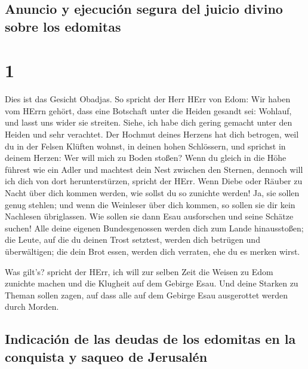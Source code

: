 \hypertarget{anuncio-y-ejecuciuxf3n-segura-del-juicio-divino-sobre-los-edomitas}{%
\subsection{Anuncio y ejecución segura del juicio divino sobre los
edomitas}\label{anuncio-y-ejecuciuxf3n-segura-del-juicio-divino-sobre-los-edomitas}}

\hypertarget{section}{%
\section{1}\label{section}}

 Dies ist das Gesicht Obadjas. So spricht der Herr HErr
von Edom: Wir haben vom HErrn gehört, dass eine Botschaft unter die
Heiden gesandt sei: Wohlauf, und lasst uns wider sie streiten.
 Siehe, ich habe dich gering gemacht unter den Heiden und
sehr verachtet.  Der Hochmut deines Herzens hat dich
betrogen, weil du in der Felsen Klüften wohnst, in deinen hohen
Schlössern, und sprichst in deinem Herzen: Wer will mich zu Boden
stoßen?  Wenn du gleich in die Höhe führest wie ein Adler
und machtest dein Nest zwischen den Sternen, dennoch will ich dich von
dort herunterstürzen, spricht der HErr.  Wenn Diebe oder
Räuber zu Nacht über dich kommen werden, wie sollst du so zunichte
werden! Ja, sie sollen genug stehlen; und wenn die Weinleser über dich
kommen, so sollen sie dir kein Nachlesen übriglassen.  Wie
sollen sie dann Esau ausforschen und seine Schätze suchen!
 Alle deine eigenen Bundesgenossen werden dich zum Lande
hinausstoßen; die Leute, auf die du deinen Trost setztest, werden dich
betrügen und überwältigen; die dein Brot essen, werden dich verraten,
ehe du es merken wirst.

 Was gilt's? spricht der HErr, ich will zur selben Zeit
die Weisen zu Edom zunichte machen und die Klugheit auf dem Gebirge
Esau.  Und deine Starken zu Theman sollen zagen, auf dass
alle auf dem Gebirge Esau ausgerottet werden durch Morden.

\hypertarget{indicaciuxf3n-de-las-deudas-de-los-edomitas-en-la-conquista-y-saqueo-de-jerusaluxe9n}{%
\subsection{Indicación de las deudas de los edomitas en la conquista y
saqueo de
Jerusalén}\label{indicaciuxf3n-de-las-deudas-de-los-edomitas-en-la-conquista-y-saqueo-de-jerusaluxe9n}}

